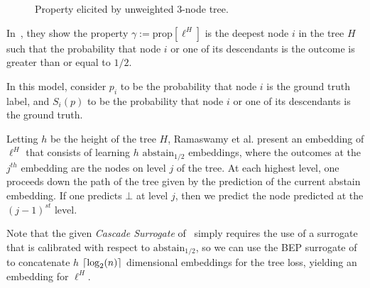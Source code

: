 \documentclass[12pt]{article}
\newcommand{\Comments}{1}
\newcommand{\mynote}[2]{\ifnum\Comments=1\textcolor{#1}{#2}\fi}
\newcommand{\jessie}[1]{\mynote{purple}{[JF: #1]}}
\newcommand{\proposedadd}[1]{\mynote{orange}{#1}}
\newcommand{\reals}{\mathbb{R}}
\newcommand{\prop}[1]{\mathrm{prop}[#1]}
\newcommand{\abstain}[1]{\mathrm{abstain}_{#1}}
\newcommand{\R}{\mathcal{R}}
\DeclarePairedDelimiter\ceil{\lceil}{\rceil}
\begin{document}
\begin{figure}
\begin{minipage}{0.45\linewidth}
	\caption{Property elicited by unweighted 3-node tree.}
\end{minipage}
\end{figure}

In~\cite[Theorem 1]{ramaswamy2015hierarchical}, they show the property $\gamma := \prop{\ell^H}$ is the deepest node $i$ in the tree $H$ such that the probability that node $i$ or one of its descendants is the outcome is greater than or equal to $1/2$.

In this model, consider $p_i$ to be the probability that node $i$ is the ground truth label, and $S_i(p)$ to be the probability that node $i$ or one of its descendants is the ground truth.

Letting $h$ be the height of the tree $H$, Ramaswamy et al. present an embedding of $\ell^H$ that consists of learning $h$ $\abstain{1/2}$ embeddings, where the outcomes at the $j^{th}$ embedding are the nodes on level $j$ of the tree.
At each highest level, one proceeds down the path of the tree given by the prediction of the current abstain embedding.
If one predicts $\bot$ at level $j$, then we predict the node predicted at the $(j-1)^{st}$ level.

Note that the given \emph{Cascade Surrogate} of~\cite[Equation 2]{ramaswamy2015hierarchical} simply requires the use of a surrogate that is calibrated with respect to $\abstain{1/2}$, so we can use the BEP surrogate of~\cite{ramaswamy2018consistent} to concatenate $h$ $\ceil{\log_2(n)}$ dimensional embeddings for the tree loss, yielding an embedding for $\ell^H$.

\end{document}
